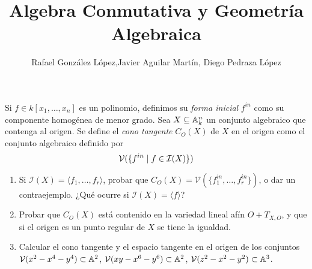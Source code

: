 \documentclass[twoside]{article}
\begin{document}
\title{Algebra Conmutativa y Geometría Algebraica}
\author{Rafael González López,Javier Aguilar Martín,  Diego Pedraza López}
\maketitle

\begin{ejercicio}{1}
Si $f \in k[x_1,\dots,x_n]$ es un polinomio, definimos su \textit{forma inicial} $f^{in}$ como su componente homogénea de menor grado. Sea $X \subseteq \mathbb{A}_k^n$ un conjunto algebraico que contenga al origen. Se define el \textit{cono tangente} $C_O(X)$ de $X$ en el origen como el conjunto algebraico definido por
\[ \mathcal{V}(\{f^{in} \mid f \in \mathcal{I}(X)\}) \]
\begin{enumerate}
	\item Si $\mathcal{I}(X) = \langle f_1,\dots,f_r \rangle$, probar que $C_O(X) = \mathcal{V}(\{f_1^{in},\dots,f_r^{in}\})$, o dar un contraejemplo. ¿Qué ocurre si $\mathcal{I}(X) = \langle f \rangle$?
	\item Probar que $C_O(X)$ está contenido en la variedad lineal afín $O + T_{X,O}$, y que si el origen es un punto regular de $X$ se tiene la igualdad.
	\item Calcular el cono tangente y el espacio tangente en el origen de los conjuntos $\mathcal{V}(x^2-x^4-y^4) \subset \mathbb{A}^2$, $\mathcal{V}(xy-x^6-y^6) \subset \mathbb{A}^2$, $\mathcal{V}(z^2-x^2-y^2) \subset \mathbb{A}^3$.
\end{enumerate}
\end{ejercicio}
\end{document}
